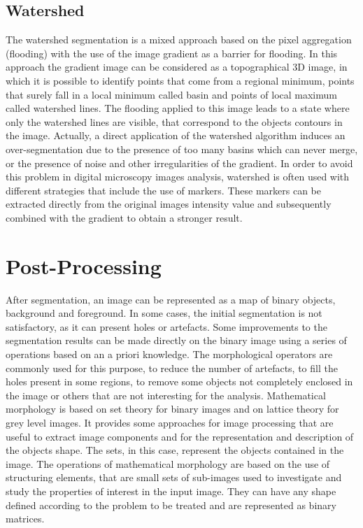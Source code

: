 \documentclass[final,a4paper,12pt,english]{UnicaPhdThesis3}
\begin{document}
\subsection{Watershed} \label{watershed} %
The watershed segmentation \cite{Meyer} is a mixed approach based on the pixel aggregation (flooding) with the use of the image gradient as a barrier for flooding. In this approach the gradient image can be considered as a topographical 3D image, in which it is possible to identify points that come from a regional minimum, points that surely fall in a local minimum called basin and points of local maximum called watershed lines. The flooding applied to this image leads to a state where only the watershed lines are visible, that correspond to the objects contours in the image. Actually, a direct application of the watershed algorithm induces an over-segmentation due to the presence of too many basins which can never merge, or the presence of noise and other irregularities of the gradient. In order to avoid this problem in digital microscopy images analysis, watershed is often used with different strategies that include the use of markers. These markers can be extracted directly from the original images intensity value and subsequently combined with the gradient to obtain a stronger result.

\section{Post-Processing} \label{postp}
After segmentation, an image can be represented as a map of binary objects, background and foreground. In some cases, the initial segmentation is not satisfactory, as it can present holes or artefacts. Some improvements to the segmentation results can be made directly on the binary image using a series of operations based on an a priori knowledge. The morphological operators are commonly used for this purpose, to reduce the number of artefacts, to fill the holes present in some regions, to remove some objects not completely enclosed in the image or others that are not interesting for the analysis. Mathematical morphology is based on set theory for binary images \cite{Serra, Serra2} and on lattice theory for grey level images. It provides some approaches for image processing that are useful to extract image components and for the representation and description of the objects shape. The sets, in this case, represent the objects contained in the image. The operations of mathematical morphology are based on the use of structuring elements, that are small sets of sub-images used to investigate and study the properties of interest in the input image. They can have any shape defined according to the problem to be treated and are represented as binary matrices.
\end{document}
